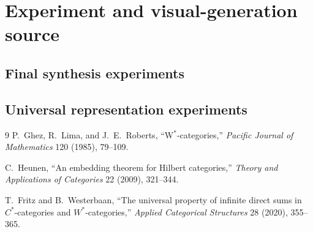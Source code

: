 \documentclass[11pt]{article}
\theoremstyle{definition}
\theoremstyle{remark}
\begin{document}
\clearpage
\section{Experiment and visual-generation source}



\clearpage
\subsection{Final synthesis experiments}


\clearpage
\subsection{Universal representation experiments}


\clearpage
\begin{thebibliography}{9}
P.~Ghez, R.~Lima, and J.~E.~Roberts,
``W$^*$-categories,''
\emph{Pacific Journal of Mathematics} 120 (1985), 79--109.

C.~Heunen,
``An embedding theorem for Hilbert categories,''
\emph{Theory and Applications of Categories} 22 (2009), 321--344.

T.~Fritz and B.~Westerbaan,
``The universal property of infinite direct sums in $C^*$-categories and $W^*$-categories,''
\emph{Applied Categorical Structures} 28 (2020), 355--365.
\end{thebibliography}
\end{document}
